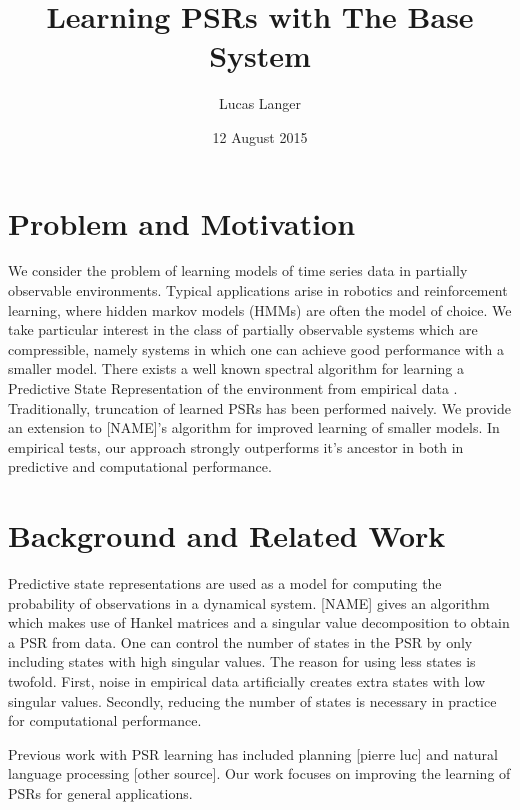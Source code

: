 \documentclass{acm_proc_article-sp}
\begin{document}
\title{Learning PSRs with The Base System}


\author{
\alignauthor
Lucas Langer\\
}

\date{12 August 2015}

\maketitle

\section{Problem and Motivation}

We consider the problem of learning models of time series data in partially observable environments. Typical applications arise in robotics and reinforcement learning, where hidden markov models (HMMs) are often the model of choice. We take particular interest in the class of partially observable systems which are compressible, namely systems in which one can achieve good performance with a smaller model. There exists a well known spectral algorithm for learning a Predictive State Representation of the environment from empirical data \cite{bowman:reasoning}. Traditionally, truncation of learned PSRs has been performed naively. We provide an extension to [NAME]'s algorithm for improved learning of smaller models. In empirical tests, our approach strongly outperforms it's ancestor in both in predictive and computational performance.

\section{Background and Related Work}

Predictive state representations are used as a model for computing the probability of observations in a dynamical system. [NAME] gives an algorithm which makes use of Hankel matrices and a singular value decomposition to obtain a PSR from data. One can control the number of states in the PSR by only including states with high singular values. The reason for using less states is twofold. First, noise in empirical data artificially creates extra states with low singular values. Secondly, reducing the number of states is necessary in practice for computational performance. 

Previous work with PSR learning has included planning [pierre luc] and natural language processing [other source]. Our work focuses on improving the learning of PSRs for general applications.
\end{document}
